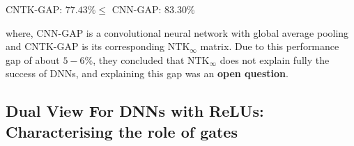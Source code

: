 {\centering CNTK-GAP: $\mathbf{77.43\%}\leq $ CNN-GAP: $\mathbf{83.30\%}$\par}

where, CNN-GAP is a convolutional neural network with global average pooling and CNTK-GAP is its corresponding $\text{NTK}_{\infty}$ matrix. Due to this performance gap of about $5-6\%$, they concluded that $\text{NTK}_{\infty}$ does not explain fully the success of DNNs, and explaining this gap was an \textbf{open question}.%

\subsection{Dual View For DNNs with ReLUs: Characterising the role of gates}

